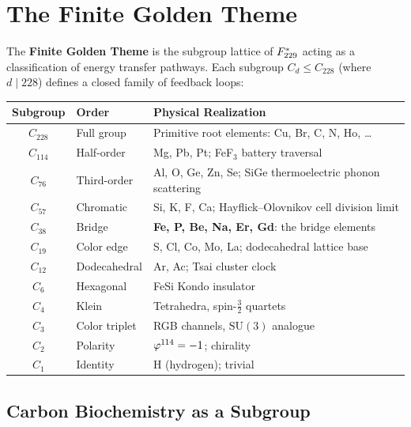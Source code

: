 \section{The Finite Golden Theme}
\label{sec:finite-golden-theme}

\begin{definition}
The \textbf{Finite Golden Theme} is the subgroup lattice of $F_{229}^*$ acting as a classification of energy transfer pathways.  Each subgroup $C_d \leq C_{228}$ (where $d \mid 228$) defines a closed family of feedback loops:

\begin{center}
\begin{tabular}{cll}
\toprule
Subgroup & Order & Physical Realization \\
\midrule
$C_{228}$ & Full group & Primitive root elements: Cu, Br, C, N, Ho, \ldots \\
$C_{114}$ & Half-order & Mg, Pb, Pt; FeF$_3$ battery traversal \\
$C_{76}$  & Third-order & Al, O, Ge, Zn, Se; SiGe thermoelectric phonon scattering \\
$C_{57}$  & Chromatic & Si, K, F, Ca; Hayflick--Olovnikov cell division limit \\
$C_{38}$  & Bridge & \textbf{Fe, P, Be, Na, Er, Gd}: the bridge elements \\
$C_{19}$  & Color edge & S, Cl, Co, Mo, La; dodecahedral lattice base \\
$C_{12}$  & Dodecahedral & Ar, Ac; Tsai cluster clock \\
$C_6$     & Hexagonal & FeSi Kondo insulator \\
$C_4$     & Klein & Tetrahedra, spin-$\tfrac{3}{2}$ quartets \\
$C_3$     & Color triplet & RGB channels, $\mathrm{SU}(3)$ analogue \\
$C_2$     & Polarity & $\varphi^{114} = -1$; chirality \\
$C_1$     & Identity & $\mathrm{H}$ (hydrogen); trivial \\
\bottomrule
\end{tabular}
\end{center}
\end{definition}

\subsection{Carbon Biochemistry as a Subgroup}


